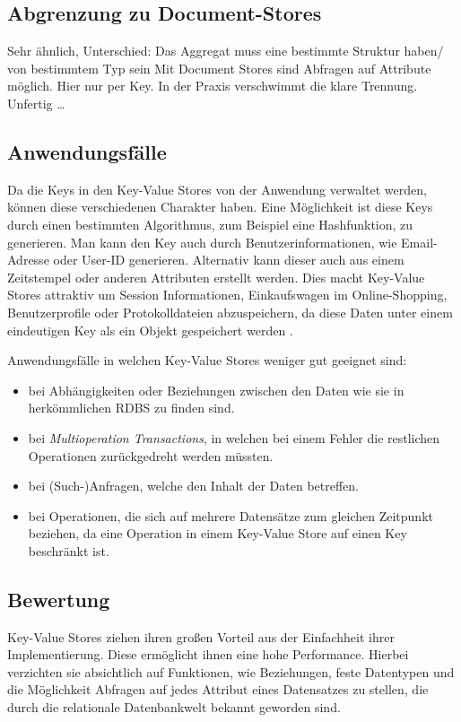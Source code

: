 \subsection{Abgrenzung zu Document-Stores}
Sehr ähnlich, Unterschied: Das Aggregat muss eine bestimmte Struktur haben/ von bestimmtem Typ sein
Mit Document Stores sind Abfragen auf Attribute möglich. Hier nur per Key.
In der Praxis verschwimmt die klare Trennung.
Unfertig …

\subsection{Anwendungsfälle}
Da die Keys in den Key-Value Stores von der Anwendung verwaltet werden, können diese verschiedenen Charakter haben. Eine Möglichkeit ist diese Keys durch einen bestimmten Algorithmus, zum Beispiel eine Hashfunktion, zu generieren. Man kann den Key auch durch Benutzerinformationen, wie Email-Adresse oder User-ID generieren. Alternativ kann dieser auch aus einem Zeitstempel oder anderen Attributen erstellt werden. Dies macht Key-Value Stores attraktiv um Session Informationen, Einkaufswagen im Online-Shopping, Benutzerprofile oder Protokolldateien abzuspeichern, da diese Daten unter einem eindeutigen Key als ein Objekt gespeichert werden \cite{sadalage01}. 

Anwendungsfälle in welchen Key-Value Stores weniger gut geeignet sind:
\begin{itemize}
\item bei Abhängigkeiten oder Beziehungen zwischen den Daten wie sie in herkömmlichen RDBS zu finden sind.
\item bei \textit{Multioperation Transactions}, in welchen bei einem Fehler die restlichen Operationen zurückgedreht werden müssten.
\item bei (Such-)Anfragen, welche den Inhalt der Daten betreffen.
\item bei Operationen, die sich auf mehrere Datensätze zum gleichen Zeitpunkt beziehen, da eine Operation in einem Key-Value Store auf einen Key beschränkt ist.
\end{itemize}

\subsection{Bewertung}
Key-Value Stores ziehen ihren großen Vorteil aus der Einfachheit ihrer Implementierung. Diese ermöglicht ihnen eine hohe Performance. Hierbei verzichten sie absichtlich auf Funktionen, wie Beziehungen, feste Datentypen und die Möglichkeit Abfragen auf jedes Attribut eines Datensatzes zu stellen, die durch die relationale Datenbankwelt bekannt geworden sind. 

